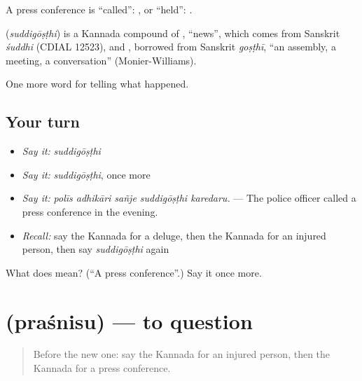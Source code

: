 A press conference is \textquotedblleft{}called\textquotedblright{}:  , or \textquotedblleft{}held\textquotedblright{}:  .

\begin{cousinweb}
\textbf{} (\emph{suddigōṣṭhi}) is a Kannada compound of , \textquotedblleft{}news\textquotedblright{}, which comes from Sanskrit \emph{śuddhi} (CDIAL 12523), and , borrowed from Sanskrit \emph{goṣṭhī}, \textquotedblleft{}an assembly, a meeting, a conversation\textquotedblright{} (Monier-Williams).
\end{cousinweb}

\begin{grammarlens}[title={What you've built}]
One more word for telling what happened.
\end{grammarlens}

\subsection*{Your turn}
\begin{itemize}
\raggedright
  \item \emph{Say it:} \emph{suddigōṣṭhi}
  \item \emph{Say it:} \emph{suddigōṣṭhi}, once more
  \item \emph{Say it:} \emph{polīs adhikāri sañje suddigōṣṭhi karedaru.} — The police officer called a press conference in the evening.
  \item \emph{Recall:} say the Kannada for a deluge, then the Kannada for an injured person, then say \emph{suddigōṣṭhi} again
\end{itemize}

\begin{tcolorbox}[breakable,colback=teal!4,colframe=teal!35!black,title={Before you move on}]
What does  mean? (\textquotedblleft{}A press conference\textquotedblright{}.) Say it once more.
\end{tcolorbox}
\section[\texorpdfstring{\kn{ಪ್ರಶ್ನಿಸು} (praśnisu)}{ಪ್ರಶ್ನಿಸು (praśnisu)}]{ (praśnisu) — to question}

\label{lesson:KA-C347-prasnisu}



\begin{quote}
Before the new one: say the Kannada for an injured person, then the Kannada for a press conference.
\end{quote}

